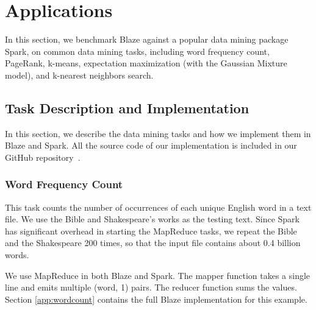 \section{Applications}
\label{sec:app}

In this section, we benchmark Blaze against a popular data mining package Spark, on common data mining tasks, including word frequency count, PageRank, k-means, expectation maximization (with the Gaussian Mixture model), and k-nearest neighbors search.

\subsection{Task Description and Implementation}

In this section, we describe the data mining tasks and how we implement them in Blaze and Spark.
All the source code of our implementation is included in our GitHub repository~\cite{blaze}.

\subsubsection{Word Frequency Count}

This task counts the number of occurrences of each unique English word in a text file.
We use the Bible and Shakespeare's works as the testing text.
Since Spark has significant overhead in starting the MapReduce tasks, we repeat the Bible and the Shakespeare 200 times, so that the input file contains about 0.4 billion words.

We use MapReduce in both Blaze and Spark.
The mapper function takes a single line and emits multiple (word, 1) pairs.
The reducer function sums the values.
Section \ref{app:wordcount} contains the full Blaze implementation for this example.

